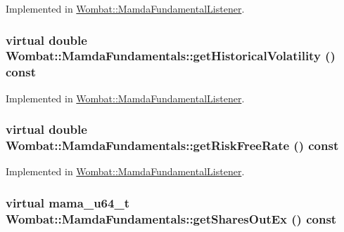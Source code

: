 Implemented in \hyperlink{classWombat_1_1MamdaFundamentalListener_11041dcd12c8969eebdd41e6f96afed8}{Wombat::Mamda\-Fundamental\-Listener}.\hypertarget{classWombat_1_1MamdaFundamentals_be98df579caf8109ed31669009a0a4b1}{
\subsubsection[getHistoricalVolatility]{\setlength{\rightskip}{0pt plus 5cm}virtual double Wombat::Mamda\-Fundamentals::get\-Historical\-Volatility () const}}
\label{classWombat_1_1MamdaFundamentals_be98df579caf8109ed31669009a0a4b1}




Implemented in \hyperlink{classWombat_1_1MamdaFundamentalListener_975c5df94470d5d3a50f04f9bf86a741}{Wombat::Mamda\-Fundamental\-Listener}.\hypertarget{classWombat_1_1MamdaFundamentals_b2e1924e7f3329a29376f6ac60c7972e}{
\subsubsection[getRiskFreeRate]{\setlength{\rightskip}{0pt plus 5cm}virtual double Wombat::Mamda\-Fundamentals::get\-Risk\-Free\-Rate () const}}
\label{classWombat_1_1MamdaFundamentals_b2e1924e7f3329a29376f6ac60c7972e}




Implemented in \hyperlink{classWombat_1_1MamdaFundamentalListener_7ee4b7ae2fa8cf35ff7892a7bb2831ef}{Wombat::Mamda\-Fundamental\-Listener}.\hypertarget{classWombat_1_1MamdaFundamentals_f4229948e3f79b0cc686985243a14749}{
\subsubsection[getSharesOutEx]{\setlength{\rightskip}{0pt plus 5cm}virtual mama\_\-u64\_\-t Wombat::Mamda\-Fundamentals::get\-Shares\-Out\-Ex () const}}
\label{classWombat_1_1MamdaFundamentals_f4229948e3f79b0cc686985243a14749}


